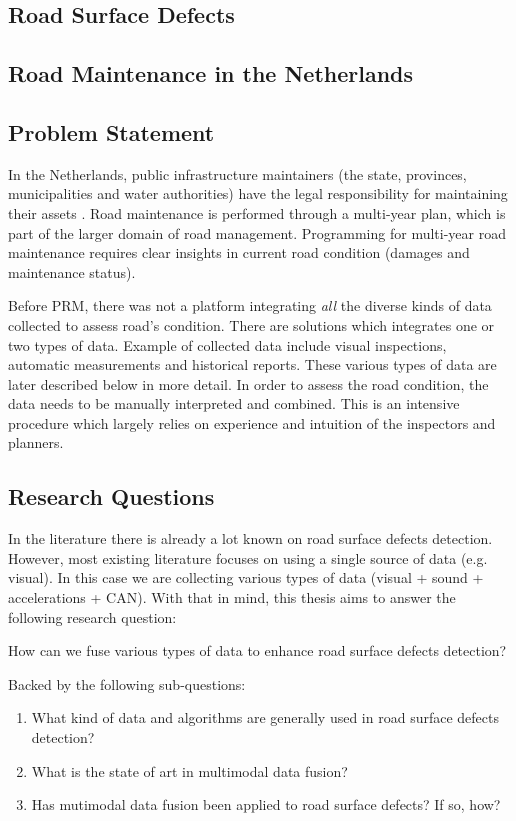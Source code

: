 \subsection{Road Surface Defects}

\subsection{Road Maintenance in the Netherlands}

\subsection{Problem Statement}

In the Netherlands, public infrastructure maintainers (the state, provinces, municipalities and water authorities) have the legal responsibility for maintaining their assets \cite{Wegenwet}. Road maintenance is performed through a multi-year plan, which is part of the larger domain of road management. Programming for multi-year road maintenance requires clear insights in current road condition (damages and maintenance status).

Before PRM, there was not a platform integrating \textit{all} the diverse kinds of data collected to assess road's condition. There are solutions which integrates one or two types of data. Example of collected data include visual inspections, automatic measurements and historical reports. These various types of data are later described below in more detail. In order to assess the road condition, the data needs to be manually interpreted and combined. This is an intensive procedure which largely relies on experience and intuition of the inspectors and planners.

\subsection{Research Questions}

In the literature there is already a lot known on road surface defects detection. However, most existing literature focuses on using a single source of data (e.g. visual). In this case we are collecting various types of data (visual + sound + accelerations + CAN). With that in mind, this thesis aims to answer the following research question:

How can we fuse various types of data to enhance road surface defects detection?

Backed by the following sub-questions:
\begin{enumerate}
\item What kind of data and algorithms are generally used in road surface defects detection?
\item What is the state of art in multimodal data fusion?
\item Has mutimodal data fusion been applied to road surface defects? If so, how?
\end{enumerate}

